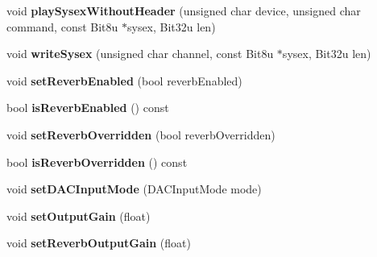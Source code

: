\begin{DoxyCompactItemize}
\item 
\hypertarget{classMT32Emu_1_1Synth_a0051b2cae56632c6430aa94129a139dd}{void {\bfseries play\-Sysex\-Without\-Header} (unsigned char device, unsigned char command, const Bit8u $\ast$sysex, Bit32u len)}\label{classMT32Emu_1_1Synth_a0051b2cae56632c6430aa94129a139dd}

\item 
\hypertarget{classMT32Emu_1_1Synth_a47f910821894b65f296abac5f1adc29e}{void {\bfseries write\-Sysex} (unsigned char channel, const Bit8u $\ast$sysex, Bit32u len)}\label{classMT32Emu_1_1Synth_a47f910821894b65f296abac5f1adc29e}

\item 
\hypertarget{classMT32Emu_1_1Synth_a534e5fa45e6eabc353cdee7e1b4509fc}{void {\bfseries set\-Reverb\-Enabled} (bool reverb\-Enabled)}\label{classMT32Emu_1_1Synth_a534e5fa45e6eabc353cdee7e1b4509fc}

\item 
\hypertarget{classMT32Emu_1_1Synth_a08b156882071c660f292652ff59aa1d4}{bool {\bfseries is\-Reverb\-Enabled} () const }\label{classMT32Emu_1_1Synth_a08b156882071c660f292652ff59aa1d4}

\item 
\hypertarget{classMT32Emu_1_1Synth_a330ccf63aa11f6a21977a2bba8ae5407}{void {\bfseries set\-Reverb\-Overridden} (bool reverb\-Overridden)}\label{classMT32Emu_1_1Synth_a330ccf63aa11f6a21977a2bba8ae5407}

\item 
\hypertarget{classMT32Emu_1_1Synth_a9230bbed2e0993d813949bee11cf91e0}{bool {\bfseries is\-Reverb\-Overridden} () const }\label{classMT32Emu_1_1Synth_a9230bbed2e0993d813949bee11cf91e0}

\item 
\hypertarget{classMT32Emu_1_1Synth_a9f65e4b6cae1fcb89c6285b110ffea9b}{void {\bfseries set\-D\-A\-C\-Input\-Mode} (D\-A\-C\-Input\-Mode mode)}\label{classMT32Emu_1_1Synth_a9f65e4b6cae1fcb89c6285b110ffea9b}

\item 
\hypertarget{classMT32Emu_1_1Synth_a049b41fa822acdad81de06eac1a2388b}{void {\bfseries set\-Output\-Gain} (float)}\label{classMT32Emu_1_1Synth_a049b41fa822acdad81de06eac1a2388b}

\item 
\hypertarget{classMT32Emu_1_1Synth_ab01cd850ae9870060da1fb8ded620ed1}{void {\bfseries set\-Reverb\-Output\-Gain} (float)}\label{classMT32Emu_1_1Synth_ab01cd850ae9870060da1fb8ded620ed1}


\end{DoxyCompactItemize}
